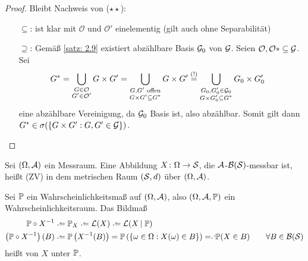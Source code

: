 \begin{proof}
	Bleibt Nachweis von ($\star\star$):
	
	\begin{itemize}
		\item[$\subseteq$:] ist klar mit $\mathcal{O}$ und $\mathcal{O}'$ einelementig (gilt auch ohne Separabilität)
		\item[$\supseteq$:] Gemäß \cref{satz: 2.9} existiert abzählbare Basis $\G_0$ von $\G$. Seien $\mathcal{O}, \mathcal{O}* \subseteq \G$. Sei
		\begin{align*}
			G^\ast &=\bigcup_{\begin{subarray}{c}
					G \in \mathcal{O}\\
					G' \in \mathcal{O}'
			\end{subarray}}G \times  G'
			=
			\bigcup_{\begin{subarray}{c}
					G,G'\text{ offen}\\
					G \times G' \subseteq G^\ast
			\end{subarray}}
			G \times  G' 
			\overset{(!)}{=}
			\bigcup_{\begin{subarray}{c}
					G_0,G_0' \in \G_0\\
					G \times  G_0' \subseteq  G^\ast
			\end{subarray}}
			G_0 \times  G_0'
		\end{align*}
		eine abzählbare Vereinigung, da $\G_0$ Basis ist, also abzählbar. Somit gilt dann $G^\ast \in \sigma (\{G \times  G' : G,G' \in \G \})$.
	\end{itemize}
\end{proof}

\begin{definition} \label{definition: 3.4}
	Sei $(\Omega,\A)$ ein Messraum.
	Eine Abbildung $X \colon \Omega \to \S$, die $\A$-$\B(\S)$-messbar ist, heißt  (ZV) in dem metrischen Raum $(\S,d)$ über $(\Omega,\A)$.

	Sei $\P$ ein Wahrscheinlichkeitsmaß auf $(\Omega,\A)$, also $(\Omega,\A,\P)$ ein Wahrscheinlichkeitsraum.
	Das Bildmaß
	\begin{align*}
		\P \circ  X^{-1} &\defeq \P_X \defeq \L(X) \defeq \L(X\,|\;\P) \\
		\brackets{\P \circ X^{-1}}(B)
		&\defeq \P\brackets{X^{-1}(B)}
		=\P\brackets{\menge{\omega \in \Omega : X(\omega) \in  B}}
		\defqe \P(X \in  B) \qquad\forall B \in \B(\S)
	\end{align*}
	heißt  von $X$ unter $\P$.
\end{definition}

